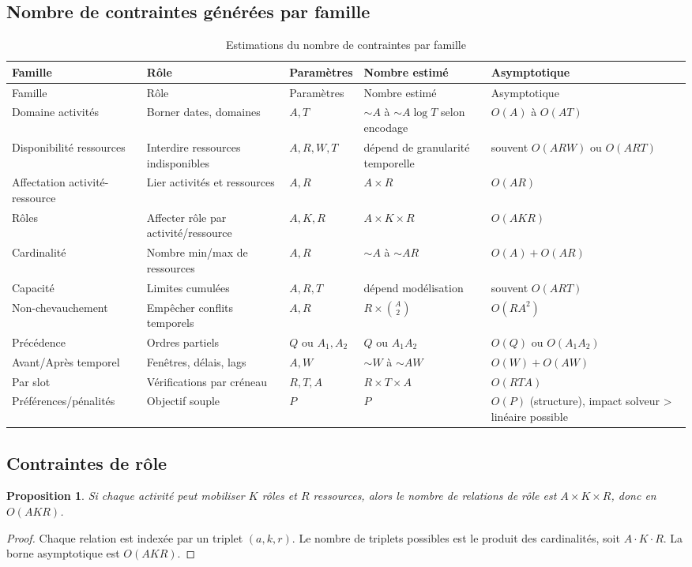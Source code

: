 \documentclass[12pt,a4paper]{article}
\newtheorem{proposition}{Proposition}[section]
\begin{document}
\subsection{Nombre de contraintes générées par famille}
\begin{longtable}{@{}p{3.0cm}p{3.0cm}p{3.4cm}p{3.2cm}p{2.6cm}@{}}
\caption{Estimations du nombre de contraintes par famille}\label{tab:contraintes-familles}\\
\toprule
Famille & Rôle & Paramètres & Nombre estimé & Asymptotique \\
\midrule
\endfirsthead
\toprule
Famille & Rôle & Paramètres & Nombre estimé & Asymptotique \\
\midrule
\endhead
Domaine activités & Borner dates, domaines & $A,T$ & $\sim A$ à $\sim A\log T$ selon encodage & $O(A)$ à $O(AT)$ \\
Disponibilité ressources & Interdire ressources indisponibles & $A,R,W,T$ & dépend de granularité temporelle & souvent $O(ARW)$ ou $O(ART)$ \\
Affectation activité-ressource & Lier activités et ressources & $A,R$ & $A\times R$ & $O(AR)$ \\
Rôles & Affecter rôle par activité/ressource & $A,K,R$ & $A\times K\times R$ & $O(AKR)$ \\
Cardinalité & Nombre min/max de ressources & $A,R$ & $\sim A$ à $\sim AR$ & $O(A)+O(AR)$ \\
Capacité & Limites cumulées & $A,R,T$ & dépend modélisation & souvent $O(ART)$ \\
Non-chevauchement & Empêcher conflits temporels & $A,R$ & $R\times \binom{A}{2}$ & $O(RA^2)$ \\
Précédence & Ordres partiels & $Q$ ou $A_1,A_2$ & $Q$ ou $A_1A_2$ & $O(Q)$ ou $O(A_1A_2)$ \\
Avant/Après temporel & Fenêtres, délais, lags & $A,W$ & $\sim W$ à $\sim AW$ & $O(W)+O(AW)$ \\
Par slot & Vérifications par créneau & $R,T,A$ & $R\times T\times A$ & $O(RTA)$ \\
Préférences/pénalités & Objectif souple & $P$ & $P$ & $O(P)$ (structure), impact solveur > linéaire possible \\
\bottomrule
\end{longtable}

\subsection{Contraintes de rôle}
\begin{proposition}
Si chaque activité peut mobiliser $K$ rôles et $R$ ressources, alors le nombre de relations de rôle est $A\times K\times R$, donc en $O(AKR)$.
\end{proposition}
\begin{proof}
Chaque relation est indexée par un triplet $(a,k,r)$. Le nombre de triplets possibles est le produit des cardinalités, soit $A\cdot K\cdot R$. La borne asymptotique est $O(AKR)$.
\end{proof}
\end{document}
